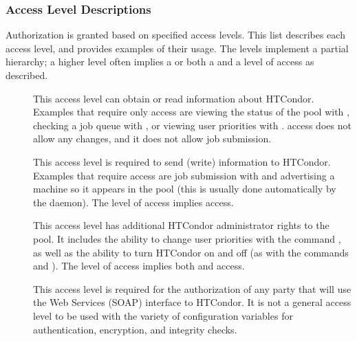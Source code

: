 \subsubsection{\label{sec:Security-access-levels}Access Level Descriptions}
Authorization is granted based on specified access levels.
This list describes each access level,
and provides examples of their usage.
The levels implement a partial hierarchy;  a higher level often implies
a  or both a 
 and a  level of access as described.

\begin{description}

\item[] \label{sec-level-read} This access level
   can obtain or read information about HTCondor.
   Examples that require only  access are
   viewing the status of the pool with , 
   checking a job queue with ,
   or viewing user priorities with .
    access does not allow any
   changes, and it does not allow job submission.

\item[] \label{sec-level-write} This access level is
   required to send (write) information to HTCondor. Examples that
   require  access are job submission with
    and advertising a machine so it appears in the pool
   (this is usually done automatically by the  daemon).
   The  level of access implies  access. 

\item[] \label{sec-level-administrator} This
   access level has additional HTCondor
   administrator rights to the pool.  It includes the ability to
   change user priorities with the command ,
   as well as the ability to turn HTCondor on and off
   (as with the commands  and ).
   The  level of access implies both
    and  access.

\item[] \label{sec-level-soap} This
   access level is required for the authorization of any party that will 
   use the Web Services (SOAP) interface to HTCondor.
   It is not a general access level to be used with the variety
   of configuration variables for authentication, encryption,
   and integrity checks.


\end{description}
